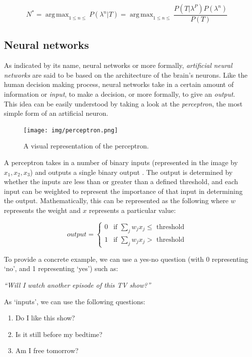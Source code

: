 \documentclass
[
    a4paper,
    twoside,
    12pt,
]
{report}
\DeclareMathOperator*{\argmax}{arg\,max}
\begin{document}
\begin{equation}
\label{eq:gmm-calculate}
N^* = \argmax_{1\leq n \leq}P(\lambda^n|T) = \argmax_{1\leq n \leq} \frac{P(T|\lambda^P)P(\lambda^n)}{P(T)}
\end{equation}

\subsection{Neural networks}

As indicated by its name, neural networks or more formally,
\emph{artificial neural networks} are said to be based on the
architecture of the brain's neurons. Like the human decision making
process, neural networks take in a certain amount of information or
\emph{input}, to make a decision, or more formally, to give an
\emph{output}. This idea can be easily understood by taking a look at
the \emph{perceptron}, the most simple form of an artificial neuron.

\begin{figure}[]
\centering
\texttt{[image: img/perceptron.png]}
\caption{A visual representation of the perceptron.}
\label{fig:perceptron}
\end{figure}

A perceptron takes in a number of binary inputs (represented in the
image by \(x_1, x_2, x_3\)) and outputs a single binary output
\parencite{nielsen2015}. The output is determined by whether the inputs
are less than or greater than a defined threshold, and each input can be
weighted to represent the importance of that input in determining the
output. Mathematically, this can be represented as the following where
\(w\) represents the weight and \(x\) represents a particular value:

\begin{equation*}
    output=\begin{cases}
        0 & \text{if $\sum_{j} w_jx_j \leq$ threshold} \\
        1 & \text{if $\sum_{j} w_jx_j >$ threshold}
    \end{cases}
\end{equation*}

To provide a concrete example, we can use a yes-no question (with 0
representing `no', and 1 representing `yes') such as:

\emph{``Will I watch another episode of this TV show?''}

As `inputs', we can use the following questions:

\begin{enumerate}
\def\labelenumi{\arabic{enumi}.}
\tightlist
\item
  Do I like this show?
\item
  Is it still before my bedtime?
\item
  Am I free tomorrow?
\end{enumerate}
\end{document}
